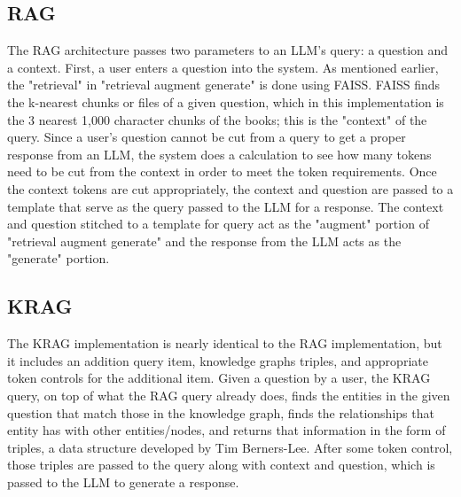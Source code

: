 \subsection{RAG}
The RAG architecture passes two parameters to an LLM's query: a question and a context. First, a user enters a question into the system. As mentioned earlier, the "retrieval" in "retrieval augment generate" is done using FAISS. FAISS finds the k-nearest chunks or files of a given question, which in this implementation is the 3 nearest 1,000 character chunks of the books; this is the "context" of the query. Since a user's question cannot be cut from a query to get a proper response from an LLM, the system does a calculation to see how many tokens need to be cut from the context in order to meet the token requirements. Once the context tokens are cut appropriately, the context and question are passed to a template that serve as the query passed to the LLM for a response. The context and question stitched to a template for query act as the "augment" portion of "retrieval augment generate" and the response from the LLM acts as the "generate" portion.

\subsection{KRAG}
The KRAG implementation is nearly identical to the RAG implementation, but it includes an addition query item, knowledge graphs triples, and appropriate token controls for the additional item. Given a question by a user, the KRAG query, on top of what the RAG query already does, finds the entities in the given question that match those in the knowledge graph, finds the relationships that entity has with other entities/nodes, and returns that information in the form of triples, a data structure developed by Tim Berners-Lee. After some token control, those triples are passed to the query along with context and question, which is passed to the LLM to generate a response.

\bigskip